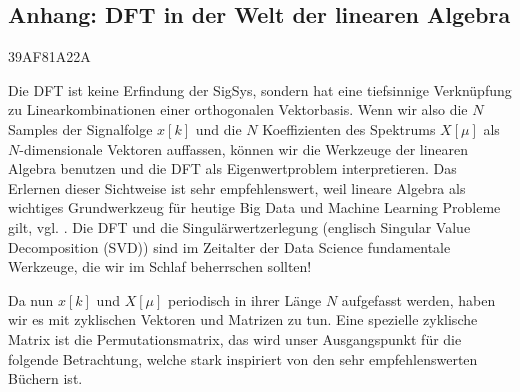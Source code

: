 
















































\clearpage
\subsection*{Anhang: DFT in der Welt der linearen Algebra}
{\tiny 39AF81A22A}
%

\noindent Die DFT ist keine Erfindung der SigSys, sondern hat eine
tiefsinnige Verknüpfung zu Linearkombinationen einer orthogonalen
Vektorbasis.
%
Wenn wir also die $N$ Samples der Signalfolge $x[k]$ und die $N$ Koeffizienten des Spektrums $X[\mu]$
als $N$-dimensionale Vektoren auffassen, können wir die Werkzeuge der linearen
Algebra benutzen und die DFT als Eigenwertproblem interpretieren.
%
Das Erlernen dieser Sichtweise ist sehr empfehlenswert,
weil lineare Algebra als wichtiges Grundwerkzeug für heutige
Big Data und Machine Learning Probleme gilt, vgl. \cite{Strang2019}.
%
Die DFT und die Singulärwertzerlegung (englisch
Singular Value Decomposition (SVD)) sind im Zeitalter der Data Science
fundamentale Werkzeuge, die wir im Schlaf beherrschen sollten!
%

Da nun $x[k]$ und $X[\mu]$ periodisch in ihrer Länge $N$ aufgefasst werden,
haben wir es mit zyklischen Vektoren und Matrizen zu tun.
%
Eine spezielle zyklische Matrix ist die Permutationsmatrix, das wird unser
Ausgangspunkt für die folgende Betrachtung, welche stark inspiriert von
den sehr empfehlenswerten Büchern \cite{Strang2016, Strang2019} ist.
%

